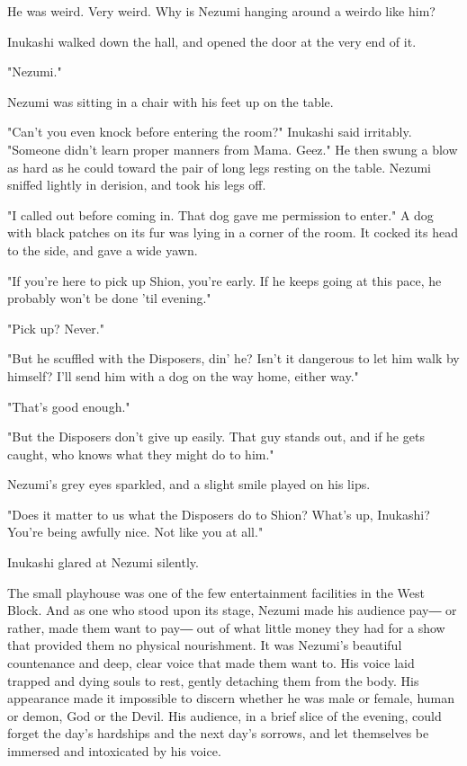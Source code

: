He was weird. Very weird. Why is Nezumi hanging around a weirdo like
him?

Inukashi walked down the hall, and opened the door at the very end of
it.

"Nezumi."

Nezumi was sitting in a chair with his feet up on the table.

"Can't you even knock before entering the room?" Inukashi said
irritably. "Someone didn't learn proper manners from Mama. Geez." He
then swung a blow as hard as he could toward the pair of long legs
resting on the table. Nezumi sniffed lightly in derision, and took his
legs off.

"I called out before coming in. That dog gave me permission to enter." A
dog with black patches on its fur was lying in a corner of the room. It
cocked its head to the side, and gave a wide yawn.

"If you're here to pick up Shion, you're early. If he keeps going at
this pace, he probably won't be done 'til evening."

"Pick up? Never."

"But he scuffled with the Disposers, din' he? Isn't it dangerous to let
him walk by himself? I'll send him with a dog on the way home, either
way."

"That's good enough."

"But the Disposers don't give up easily. That guy stands out, and if he
gets caught, who knows what they might do to him."

Nezumi's grey eyes sparkled, and a slight smile played on his lips.

"Does it matter to us what the Disposers do to Shion? What's up,
Inukashi? You're being awfully nice. Not like you at all."

Inukashi glared at Nezumi silently.

The small playhouse was one of the few entertainment facilities in the
West Block. And as one who stood upon its stage, Nezumi made his
audience pay― or rather, made them want to pay― out of what little money
they had for a show that provided them no physical nourishment. It was
Nezumi's beautiful countenance and deep, clear voice that made them want
to. His voice laid trapped and dying souls to rest, gently detaching
them from the body. His appearance made it impossible to discern whether
he was male or female, human or demon, God or the Devil. His audience,
in a brief slice of the evening, could forget the day's hardships and
the next day's sorrows, and let themselves be immersed and intoxicated
by his voice.


